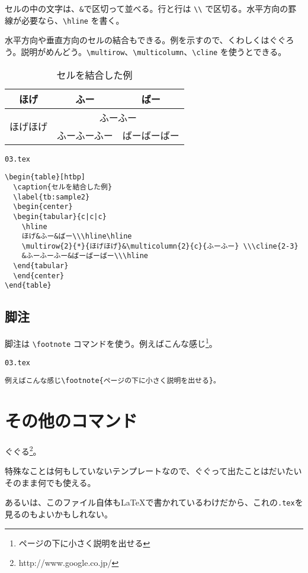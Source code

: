 セルの中の文字は、{\tt \&}で区切って並べる。行と行は \verb|\\| で区切る。水平方向の罫線が必要なら、\verb|\hline| を書く。

水平方向や垂直方向のセルの結合もできる。例を示すので、くわしくはぐぐろう。説明がめんどう。\verb|\multirow|、\verb|\multicolumn|、\verb|\cline| を使うとできる。

\begin{table}[htbp]
  \caption{セルを結合した例}
  \label{tb:sample2}
  \begin{center}
  \begin{tabular}{c|c|c}
    \hline
    ほげ&ふー&ばー\\\hline\hline
    \multirow{2}{*}{ほげほげ}&\multicolumn{2}{c}{ふーふー} \\\cline{2-3}
    &ふーふーふー&ばーばーばー\\\hline
  \end{tabular}
  \end{center}
\end{table}

\begin{itembox}[l]{{\tt 03.tex}}
\begin{verbatim}
\begin{table}[htbp]
  \caption{セルを結合した例}
  \label{tb:sample2}
  \begin{center}
  \begin{tabular}{c|c|c}
    \hline
    ほげ&ふー&ばー\\\hline\hline
    \multirow{2}{*}{ほげほげ}&\multicolumn{2}{c}{ふーふー} \\\cline{2-3}
    &ふーふーふー&ばーばーばー\\\hline
  \end{tabular}
  \end{center}
\end{table}
\end{verbatim}
\end{itembox}


\subsection{脚注}

脚注は \verb|\footnote| コマンドを使う。例えばこんな感じ\footnote{ページの下に小さく説明を出せる}。

\begin{itembox}[l]{{\tt 03.tex}}
\begin{verbatim}
例えばこんな感じ\footnote{ページの下に小さく説明を出せる}。
\end{verbatim}
\end{itembox}

\section{その他のコマンド}

ぐぐる\footnote{http://www.google.co.jp/}。

特殊なことは何もしていないテンプレートなので、ぐぐって出たことはだいたいそのまま何でも使える。

あるいは、このファイル自体も\LaTeX で書かれているわけだから、これの{\tt *.tex}を見るのもよいかもしれない。


